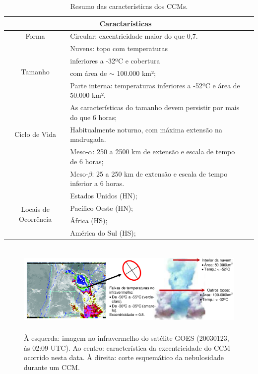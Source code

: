 \begin{table}[!hbp]
\caption{Resumo das características dos CCMs.}
\label{tab03}
\centering
\begin{tabular}{c|p{12cm}l}
\hline
\multicolumn{2}{c}{Caractarísticas}                                                 \\
\hline
Forma                                       & Circular: excentricidade maior do que 0,7.\\
\hline
\multirow{4}{2cm}{Tamanho}                  & Nuvens: topo com temperaturas \\
                                            & inferiores a -32ºC e cobertura \\
                                            & com área de $\sim$ 100.000 km²; \\
                                            & Parte interna: temperaturas inferiores a -52ºC e área de 50.000 km².         \\
\hline
\multirow{3}{2cm}{Ciclo de Vida}            & As características do tamanho devem persistir por mais do que 6 horas;   \\
                                            & Habitualmente noturno, com máxima extensão na madrugada.                \\
\hline
\multirow{3}{2cm}{Escala}                   & Meso-$\alpha$: 250 a 2500 km de extensão e escala de tempo de 6 horas;      \\
                                            & Meso-$\beta$: 25 a 250 km de extensão e escala de tempo inferior a 6 horas. \\
\hline
\multirow{4}{2cm}{Locais de Ocorrência} & Estados Unidos (HN);                  \\
                                            & Pacífico Oeste (HN);              \\
                                            & África (HS);                      \\
                                            & América do Sul (HS);              \\
\hline
\end{tabular}
\end{table}

\begin{figure}[!hbp]
\centering
\includegraphics[height=4.5cm]{./figs/fig08.png}
\caption{À esquerda: imagem no infravermelho do satélite GOES (20030123, às 02:09 UTC). Ao centro: característica da excentricidade do CCM ocorrido nesta data. À direita: corte esquemático da nebulosidade durante um CCM.}
\label{fig08}
\end{figure}

